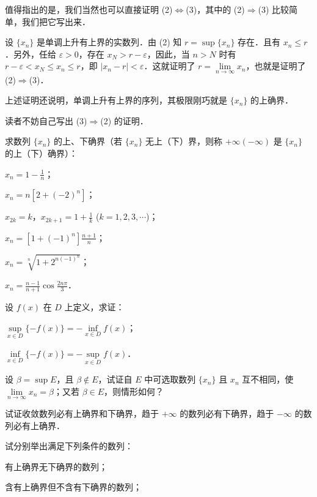 值得指出的是，我们当然也可以直接证明 (2)$\Leftrightarrow$(3)，其中的 (2)$\Rightarrow$(3) 比较简单，我们把它写出来．

设 $\{x_n\}$ 是单调上升有上界的实数列．由 (2) 知 $r = \sup\{x_n\}$ 存在．且有 $x_n \leqslant r$．另外，任给 $\varepsilon > 0$，存在 $x_N > r - \varepsilon$，因此，当 $n > N$ 时有 $r - \varepsilon < x_N \leqslant x_n \leqslant r$，即 $|x_n - r| < \varepsilon$．这就证明了 $r = \lim\limits_{n \to \infty} x_n$，也就是证明了 (2)$\Rightarrow$(3)．

上述证明还说明，单调上升有上界的序列，其极限刚巧就是 $\{x_n\}$ 的上确界．

读者不妨自己写出 (3)$\Rightarrow$(2) 的证明．

\begin{xiti}
\item 求数列 $\{x_n\}$ 的上、下确界（若 $\{x_n\}$ 无上（下）界，则称 $+\infty (-\infty)$ 是 $\{x_n\}$ 的上（下）确界）：
\begin{ziti}
\item $x_n = 1 - \frac{1}{n}$；
\item $x_n = n \left[ 2 + (-2)^n \right]$；
\item $x_{2k} = k$，$x_{2k+1} = 1 + \frac{1}{k}$ ($k = 1, 2, 3, \cdots$)；
\item $x_n = \left[ 1 + (-1)^n \right] \frac{n+1}{n}$；
\item $x_n = \sqrt[n]{1 + 2^{n(-1)^n}}$；
\item $x_n = \frac{n-1}{n+1} \cos \frac{2n\pi}{3}$．
\end{ziti}
\item 设 $f(x)$ 在 $D$ 上定义，求证：
\begin{ziti}
\item $\sup\limits_{x \in D} \{ -f(x) \} = -\inf\limits_{x \in D} f(x)$；
\item $\inf\limits_{x \in D} \{ -f(x) \} = -\sup\limits_{x \in D} f(x)$．
\end{ziti}
\item 设 $\beta = \sup E$，且 $\beta \notin E$，试证自 $E$ 中可选取数列 $\{x_n\}$ 且 $x_n$ 互不相同，使 $\lim\limits_{n \to \infty} x_n = \beta$；又若 $\beta \in E$，则情形如何？
\item 试证收敛数列必有上确界和下确界，趋于 $+\infty$ 的数列必有下确界，趋于 $-\infty$ 的数列必有上确界．
\item 试分别举出满足下列条件的数列：
\begin{ziti}
\item 有上确界无下确界的数列；
\item 含有上确界但不含有下确界的数列；

\end{ziti}
\end{xiti}
